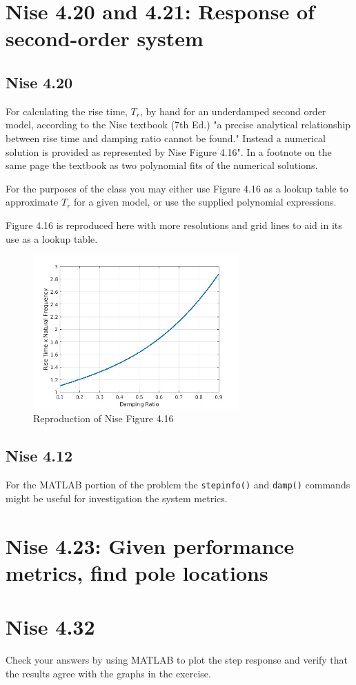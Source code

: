 \documentclass[11pt]{article}
\begin{document}
\section*{Nise 4.20 and 4.21: Response of second-order system}

\subsection*{Nise 4.20}

For calculating the rise time, $T_r$, by hand for an underdamped second order model, 
according to the Nise textbook (7th Ed.) "a precise analytical relationship between rise time and damping ratio cannot be found."  Instead a numerical solution is provided as represented by Nise Figure 4.16".  In a footnote on the same page the textbook as two polynomial fits of the numerical solutions.

For the purposes of the class you may either use Figure 4.16 as a lookup table to approximate $T_r$ for a given model, or use the supplied polynomial expressions.

Figure 4.16 is reproduced here with more resolutions and grid lines to aid in its use as a lookup table.
\begin{figure}[h]
  \centering
  \includegraphics[width=0.7\textwidth]{figure_4_16.jpg}
  \caption{Reproduction of Nise Figure 4.16}
  \label{fig:figure_4_16}
\end{figure}

\subsection*{Nise 4.12}

For the MATLAB portion of the problem the \texttt{stepinfo()} and \texttt{damp()} commands might be useful for investigation the system metrics.

\section*{Nise 4.23: Given performance metrics, find pole locations}

\section*{Nise 4.32}

Check your answers by using MATLAB to plot the step response and verify that the results agree with the graphs in the exercise.
\end{document}
